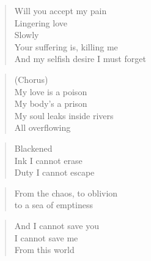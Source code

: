 \phantom{;}
\clearpage



\begin{minipage}{0.6\textwidth}
    \begin{verse}
    Will you accept my pain \\
    Lingering love \\
    Slowly \\
    Your suffering is, killing me \\
    And my selfish desire I must forget
    \end{verse}

    \begin{verse}
    (Chorus) \\
    My love is a poison \\
    My body's a prison \\
    My soul leaks inside rivers \\
    All overflowing
    \end{verse}

    \begin{verse}
    Blackened \\
    Ink I cannot erase \\
    Duty I cannot escape
    \end{verse}

    \begin{verse}
    From the chaos, to oblivion \\
    to a sea of emptiness
    \end{verse}

    \begin{verse}
    And I cannot save you \\
    I cannot save me \\
    From this world
    \end{verse}

\end{minipage}
\clearpage
